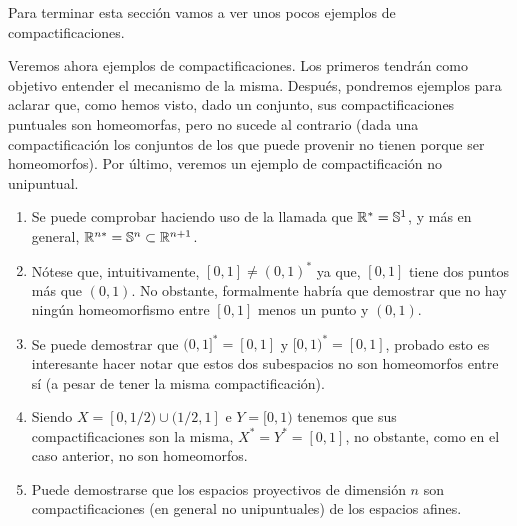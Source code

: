Para terminar esta sección vamos a ver unos pocos ejemplos de compactificaciones.
\begin{exa}[Miscelánea]
	Veremos ahora ejemplos de compactificaciones. Los primeros tendrán como objetivo entender el mecanismo de la misma. Después, pondremos ejemplos para aclarar que, como hemos visto, dado un conjunto, sus compactificaciones puntuales son homeomorfas, pero no sucede al contrario (dada una compactificación los conjuntos de los que puede provenir no tienen porque ser homeomorfos). Por último, veremos un ejemplo de compactificación no unipuntual. 
	\begin{enumerate}
		\item Se puede comprobar haciendo uso de la llamada  que $\mathbb{R}^*=\mathbb{S}^1$, y más en general, $\mathbb{R}^{n*}=\mathbb{S}^n\subset \mathbb{R}^{n+1}$.
		\item Nótese que, intuitivamente, $[0,1]\not=(0,1)^*$ ya que, $[0,1]$ tiene dos puntos más que $(0,1)$. No obstante, formalmente habría que demostrar que no hay ningún homeomorfismo entre $[0,1]$ menos un punto y $(0,1)$.
		\item Se puede demostrar que $(0,1]^*=[0,1]$ y $[0,1)^*=[0,1]$, probado esto es interesante hacer notar que estos dos subespacios no son homeomorfos entre sí (a pesar de tener la misma compactificación).
		\item Siendo $X=[0,1/2)\cup(1/2,1]$ e $Y=[0,1)$ tenemos que sus compactificaciones son la misma, $X^*=Y^*=[0,1]$, no obstante, como en el caso anterior, no son homeomorfos.
		\item Puede demostrarse que los espacios proyectivos de dimensión $n$ son compactificaciones (en general no unipuntuales) de los espacios afines.\qedhere
	\end{enumerate}
\end{exa}


